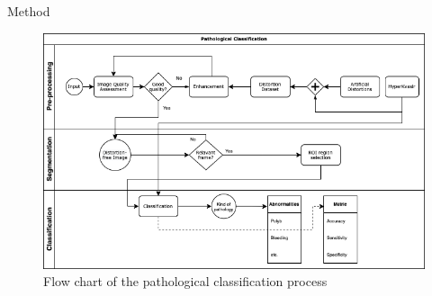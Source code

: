 \documentclass{libs/ufc_format}
\newcommand{\tikzmark}[1]{\tikz[overlay,remember picture] \node (#1) {};}
\begin{document}






\begin{frame}{Method}
    \begin{figure}
        \centering
        \includegraphics[scale=0.38]{libs/algorithm.png}
        \caption{ Flow chart of the pathological classification process}
        \label{fig:al}
    \end{figure}
\end{frame}
\end{document}
